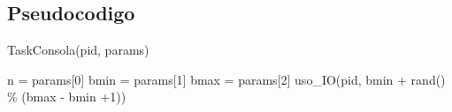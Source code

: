 \subsection{Pseudocodigo}

\begin{algorithm}[H]
\caption{TaskConsola(pid, params)}
\label{pseudo:TaskConsola}
\begin{algorithmic}

\STATE n = params[0]
\STATE bmin = params[1]
\STATE bmax = params[2]
    \STATE uso\_IO(pid, bmin + rand() \% (bmax - bmin +1))
\ENDFOR

\end{algorithmic}
\end{algorithm}
